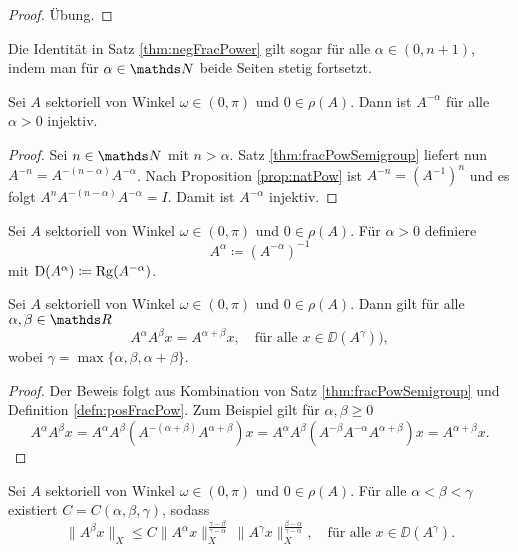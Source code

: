 \begin{proof}
  Übung.
\end{proof}

\begin{kor}
  \label{kor:negFracPower}
  Die Identität in Satz \ref{thm:negFracPower} gilt sogar für alle $\alpha \in (0,n+1)$, indem man für $\alpha \in \N$ beide Seiten stetig fortsetzt.
\end{kor}

\begin{prop}
  Sei $A$ sektoriell von Winkel $\omega \in (0,\pi)$ und $0 \in \rho(A)$.
  Dann ist $A^{-\alpha}$ für alle $\alpha > 0$ injektiv.
\end{prop}

\begin{proof}
  Sei $n \in \N$ mit $n > \alpha$.
  Satz \ref{thm:fracPowSemigroup} liefert nun $A^{-n} = A^{-(n - \alpha)}A^{-\alpha}$.
  Nach Proposition \ref{prop:natPow} ist $A^{-n} = (A^{-1})^n$ und es folgt $A^n A^{-(n - \alpha)} A^{-\alpha} = I$.
  Damit ist $A^{-\alpha}$ injektiv.
\end{proof}

\begin{defn}
  \label{defn:posFracPow}
  Sei $A$ sektoriell von Winkel $\omega \in (0,\pi)$ und $0 \in \rho(A)$.
  Für $\alpha > 0$ definiere 
  $$
  A^\alpha \coloneqq (A^{-\alpha})^{-1}
  $$
  mit $\mathrm{D}(A^\alpha) \coloneqq \operatorname{Rg}(A^{-\alpha})$.
\end{defn}

\begin{thm}
  Sei $A$ sektoriell von Winkel $\omega \in (0,\pi)$ und $0 \in \rho(A)$.
  Dann gilt für alle $\alpha, \beta \in \R$
  $$
    A^\alpha A^\beta x = A^{\alpha + \beta} x, \quad\text{für alle } x \in \DD(A^\gamma)),
  $$
  wobei $\gamma = \max\{\alpha, \beta, \alpha + \beta\}$.
\end{thm}

\begin{proof}
  Der Beweis folgt aus Kombination von Satz \ref{thm:fracPowSemigroup} und Definition \ref{defn:posFracPow}.
  Zum Beispiel gilt für $\alpha, \beta \geq 0$
  $$
  A^\alpha A^\beta x 
  = A^\alpha A^\beta (A^{-(\alpha + \beta)} A^{\alpha + \beta}) x
  = A^\alpha A^\beta (A^{-\beta} A^{-\alpha} A^{\alpha + \beta} ) x 
  = A^{\alpha + \beta} x.
  $$
\end{proof}

\begin{thm}[Momentenungleichung]
  Sei $A$ sektoriell von Winkel $\omega \in (0,\pi)$ und $0 \in \rho(A)$.
  Für alle $\alpha < \beta < \gamma$ existiert $C = C(\alpha, \beta, \gamma)$, sodass
  $$
  \| A^\beta x\|_X^{\frac{}{}} \leq C \|A^\alpha x\|_X^{\frac{\gamma - \beta}{\gamma - \alpha}} \, \|A^\gamma x \|_X^{\frac{\beta - \alpha}{\gamma - \alpha}}, \quad\text{für alle }x \in \DD(A^\gamma).
  $$
\end{thm}

